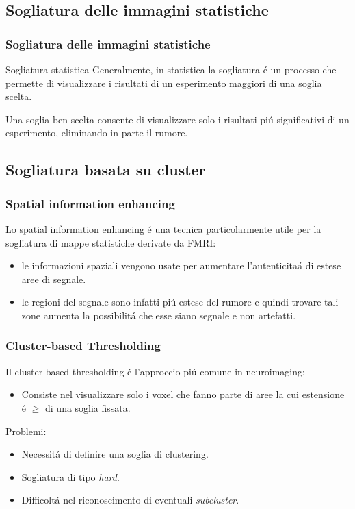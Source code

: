 \documentclass{beamer}
\begin{document}
\subsection{Sogliatura delle immagini statistiche}
\begin{frame}
\frametitle{Sogliatura delle immagini statistiche}
\begin{block}{Sogliatura statistica}
Generalmente, in statistica \alert{la sogliatura} \'e un processo che permette di visualizzare i risultati di un esperimento maggiori di una soglia scelta. 
\end{block}

\bigskip

Una soglia ben scelta consente di visualizzare solo i risultati pi\'u significativi di un esperimento, eliminando in parte il rumore.
\end{frame}

\subsection{Sogliatura basata su cluster}
\begin{frame}
\frametitle{Spatial information enhancing}
Lo spatial information enhancing \'e una tecnica particolarmente utile per la sogliatura di mappe statistiche derivate da FMRI:
\smallskip
\begin{itemize}

\item le informazioni spaziali vengono usate per aumentare l'autenticita\'a  di estese aree di segnale. 
\medskip
\item le regioni del segnale sono infatti pi\'u estese del rumore e quindi trovare tali zone aumenta la possibilit\'a che esse siano segnale e non artefatti.
\end{itemize}

\end{frame}

\begin{frame}
\frametitle{Cluster-based Thresholding}
Il cluster-based thresholding \'e l'approccio pi\'u comune in neuroimaging:
\smallskip
\begin{itemize}
\item Consiste nel visualizzare solo i voxel che fanno parte di aree la cui estensione \'e $\geq$ di una soglia fissata. 
\medskip
\end{itemize}
Problemi:
\begin{itemize}
\item Necessit\'a di definire una soglia di clustering.
\item Sogliatura di tipo \emph{hard}.
\item Difficolt\'a nel riconoscimento di eventuali \emph{subcluster}.
\end{itemize}
\end{frame}
\end{document}
